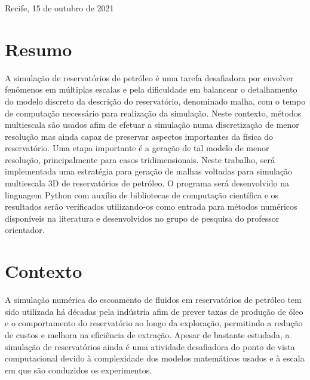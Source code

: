 \documentclass[a4paper, 10pt]{article}
\begin{document}
\vspace{2cm}
\begin{center}
    {Recife, 15 de outubro de 2021}
\end{center}

\clearpage
\setcounter{page}{1}

\fontsize{11}{13.2}\selectfont

\tableofcontents

\thispagestyle{empty}

\newpage

\section{Resumo}

\noindent
A simulação de reservatórios de petróleo é uma tarefa desafiadora por envolver fenômenos em múltiplas escalas e pela dificuldade em balancear o detalhamento do modelo discreto da descrição do reservatório, denominado malha, com o tempo de computação necessário para realização da simulação. Neste contexto, métodos multiescala são usados afim de efetuar a simulação numa discretização de menor resolução mas ainda capaz de preservar aspectos importantes da física do reservatório. Uma etapa importante é a geração de tal modelo de menor resolução, principalmente para casos tridimensionais. Neste trabalho, será implementada uma estratégia para geração de malhas voltadas para simulação multiescala 3D de reservatórios de petróleo. O programa será desenvolvido na linguagem Python com auxílio de bibliotecas de computação científica e os resultados serão verificados utilizando-os como entrada para métodos numéricos disponíveis na literatura e desenvolvidos no grupo de pesquisa do professor orientador.

\clearpage
\section{Contexto}

A simulação numérica do escoamento de fluidos em reservatórios de petróleo tem sido utilizada há décadas pela indústria afim de prever taxas de produção de óleo e o comportamento do reservatório ao longo da exploração, permitindo a redução de custos e melhora na eficiência de extração. Apesar de bastante estudada, a simulação de reservatórios ainda é uma atividade desafiadora do ponto de vista computacional devido à complexidade dos modelos matemáticos usados e à escala em que são conduzidos os experimentos.
\end{document}
